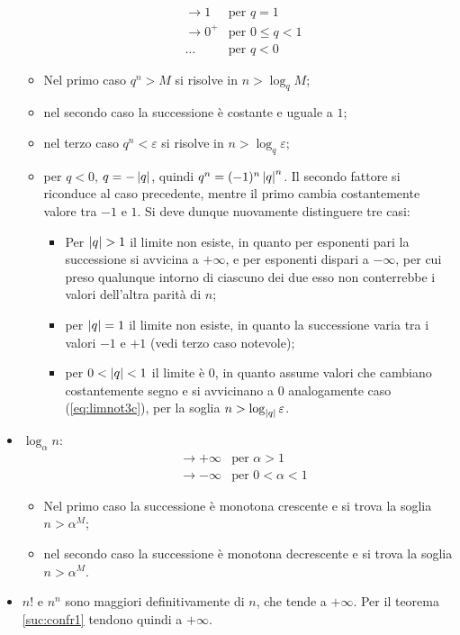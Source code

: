 \begin{itemize}
\begin{align}
		       & \to 1       & \text{per }q=1                           \\
		       & \to 0^+     & \text{per }0\leq q<1 \label{eq:limnot3c} \\
		       & \dots       & \text{per }q<0
	      \end{align}
	      \begin{itemize}
		      \item Nel primo caso $q^n>M$ si risolve in $n>\log_q M$;
		      \item nel secondo caso la successione è costante e uguale a $1$;
		      \item nel terzo caso $q^n<\varepsilon$ si risolve in $n>\log_q \varepsilon$;
		      \item per $q<0$, $q=-\left\lvert q \right\rvert$, quindi $q^n=(-1)^n\left\lvert q \right\rvert^n$. Il secondo fattore si riconduce al caso precedente, mentre il primo cambia costantemente valore tra $-1$ e $1$. Si deve dunque nuovamente distinguere tre casi:
		            \begin{itemize}
			            \item Per $\left\lvert q \right\rvert>1$ il limite non esiste, in quanto per esponenti pari la successione si avvicina a $+\infty$, e per esponenti dispari a $-\infty$, per cui preso qualunque intorno di ciascuno dei due esso non conterrebbe i valori dell'altra parità di $n$;
			            \item per $\left\lvert q \right\rvert=1$ il limite non esiste, in quanto la successione varia tra i valori $-1$ e $+1$ (vedi terzo caso notevole);
			            \item per $0<\left\lvert q \right\rvert<1$ il limite è $0$, in quanto assume valori che cambiano costantemente segno e si avvicinano a $0$ analogamente caso (\ref{eq:limnot3c}), per la soglia $n>\log_{\left\lvert q \right\rvert} \varepsilon$.
		            \end{itemize}
	      \end{itemize}
	\item $\log_\alpha n$:
	      \begin{align*}
		       & \to +\infty & \text{per }\alpha>1   \\
		       & \to -\infty & \text{per }0<\alpha<1
	      \end{align*}
	      \begin{itemize}
		      \item Nel primo caso la successione è monotona crescente e si trova la soglia $n>\alpha^M$;
		      \item nel secondo caso la successione è monotona decrescente e si trova la soglia $n>\alpha^M$.
	      \end{itemize}
	\item $n!$ e $n^n$ sono maggiori definitivamente di $n$, che tende a $+\infty$. Per il teorema \ref{suc:confr1} tendono quindi a $+\infty$.
\end{itemize}


